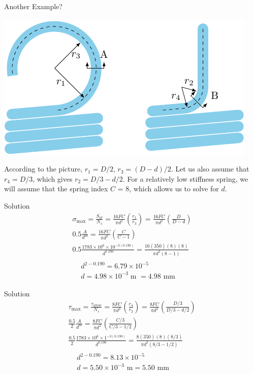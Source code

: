 \documentclass[10pt, svgnames]{beamer}
\begin{document}
\begin{frame}[label={sec:orgab2b88c}]{Another Example?}
\begin{center}
\includegraphics[width=.9\linewidth]{pictures/chest-exercise-end-coils.pdf}
\end{center}

According to the picture, \(r_1 = D / 2\), \(r_3 = (D - d) / 2\). Let us also assume that \(r_4 = D / 3\), which gives \(r_2 = D / 3 - d / 2\). For a relatively low stiffness spring, we will assume that the spring index \(C\) = 8, which allows us to solve for \(d\).
\end{frame}

\begin{frame}[label={sec:org67cffaf}]{Solution}
\begin{gather*}
  \sigma_{\max } = \frac{S_{ut}}{N_s} = \frac{16FC}{\pi d^2}\left( \frac{r_1}{r_3} \right) = \frac{16FC}{\pi d^2}\left( \frac{D}{D - d} \right) \\
  0.5\frac{A}{d^m} = \frac{16FC}{\pi d^2}\left( \frac{C}{C - 1} \right) \\ 
  0.5\frac{1783 \times {{10}^6} \times 10^{ - 3(0.190)}}{d^{0.190}} = \frac{16(350)(8)(8)}{\pi d^2(8 - 1)} \\
  \begin{aligned}
  &d^{2 - 0.190} = 6.79 \times {10^{ - 5}} \\ 
  &d = 4.98 \times {10^{ - 3}}\;{\text{m }} = 4.98\text{ mm}
  \end{aligned}
\end{gather*}
\end{frame}

\begin{frame}[label={sec:org43fcca2}]{Solution}
\begin{gather*}
  \tau_{\max } = \frac{\tau_{allow}}{N_s} = \frac{8FC}{\pi d^2}\left( \frac{r_4}{r_2} \right) = \frac{8FC}{\pi d^2}\left( \frac{D/3}{D/3 - d/2} \right) \\ 
  \frac{0.5}{2}\frac{A}{d^m} = \frac{8FC}{\pi d^2}\left( \frac{C/3}{C/3 - 1/2} \right) \\ 
  \frac{0.5}{2}\frac{1783 \times 10^6 \times 1^{ - 3(0.190)}}{d^{0.190}} = \frac{8(350)(8)(8/3)}{\pi d^2(8/3 - 1/2)} \\
  \begin{aligned}
  &d^{2 - 0.190} = 8.13 \times 10^{ - 5} \\ 
  &d = 5.50 \times 10^{ - 3}\text{ m} = 5.50 \text{ mm}
  \end{aligned}
\end{gather*}
\end{frame}
\end{document}
